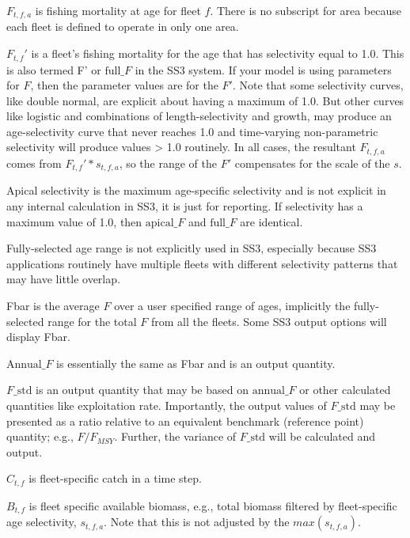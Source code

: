 $F_{t,f,a}$ is fishing mortality at age for fleet $f$. There is no subscript for area because each fleet is defined to operate in only one area.

$F_{t,f}'$ is a fleet's fishing mortality for the age that has selectivity equal to 1.0. This is also termed F' or $\text{full\_}F$ in the SS3 system. If your model is using parameters for $F$, then the parameter values are for the $F'$. Note that some selectivity curves, like double normal, are explicit about having a maximum of 1.0. But other curves like logistic and combinations of length-selectivity and growth, may produce an age-selectivity curve that never reaches 1.0 and time-varying non-parametric selectivity will produce values > 1.0 routinely. In all cases, the resultant $F_{t,f,a}$ comes from $F_{t,f}' * s_{t,f,a}$, so the range of the $F'$ compensates for the scale of the $s$.

Apical selectivity is the maximum age-specific selectivity and is not explicit in any internal calculation in SS3, it is just for reporting. If selectivity has a maximum value of 1.0, then $\text{apical\_}F$ and $\text{full\_}F$ are identical.

Fully-selected age range is not explicitly used in SS3, especially because SS3 applications routinely have multiple fleets with different selectivity patterns that may have little overlap.

Fbar is the average $F$ over a user specified range of ages, implicitly the fully-selected range for the total $F$ from all the fleets. Some SS3 output options will display Fbar.

$\text{Annual\_}F$ is essentially the same as Fbar and is an output quantity.

$F\text{\_std}$ is an output quantity that may be based on $\text{annual\_}F$ or other calculated quantities like exploitation rate. Importantly, the output values of $F\text{\_std}$ may be presented as a ratio relative to an equivalent benchmark (reference point) quantity; e.g., $F / F_{MSY}$. Further, the variance of $F\text{\_std}$ will be calculated and output.

$C_{t,f}$ is fleet-specific catch in a time step.

$B_{t,f}$ is fleet specific available biomass, e.g., total biomass filtered by fleet-specific age selectivity, $s_{t,f,a}$. Note that this is not adjusted by the $max(s_{t,f,a})$.

